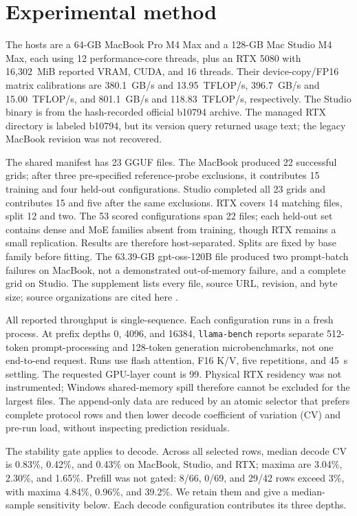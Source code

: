 \documentclass{article}
\begin{document}
\section{Experimental method}
\label{sec:method}

The hosts are a 64-GB MacBook Pro M4 Max and a 128-GB Mac Studio M4 Max, each
using 12 performance-core threads, plus an RTX 5080 with 16,302~MiB reported
VRAM, CUDA, and 16 threads.  Their device-copy/FP16 matrix calibrations are
380.1~GB/s and 13.95~TFLOP/s, 396.7~GB/s and 15.00~TFLOP/s, and 801.1~GB/s and
118.83~TFLOP/s, respectively.  The Studio binary is from the hash-recorded
official b10794 archive.  The managed RTX directory is labeled b10794, but its
version query returned usage text; the legacy MacBook revision was not recovered.

The shared manifest has 23 GGUF files.  The MacBook produced 22 successful
grids; after three pre-specified reference-probe exclusions, it contributes 15
training and four held-out configurations.  Studio completed all 23 grids and
contributes 15 and five after the same exclusions.  RTX covers 14 matching files,
split 12 and two.  The 53 scored configurations span 22 files; each held-out set
contains dense and MoE families absent from training, though RTX remains a small
replication.  Results are therefore host-separated.  Splits are fixed by base
family before fitting.  The 63.39-GB gpt-oss-120B file produced two prompt-batch
failures on MacBook, not a demonstrated out-of-memory failure, and a complete
grid on Studio.  The supplement lists every file, source URL, revision, and byte
size; source organizations are cited here \cite{unsloth_models,lmstudio_models,
ggmlorg_models,google_models,bartowski_models}.

All reported throughput is single-sequence.  Each configuration runs in a
fresh process.  At prefix depths 0, 4096, and 16384, \texttt{llama-bench}
reports separate 512-token prompt-processing and 128-token generation
microbenchmarks, not one end-to-end request.  Runs use flash attention, F16 K/V,
five repetitions, and 45~s settling.  The requested GPU-layer count is 99.  Physical
RTX residency was not instrumented; Windows shared-memory spill therefore
cannot be excluded for the largest files.  The append-only data are reduced by
an atomic selector that prefers complete protocol rows and then lower decode
coefficient of variation (CV)
and pre-run load, without inspecting prediction residuals.

The stability gate applies to decode.  Across all selected rows, median decode
CV is 0.83\%, 0.42\%, and 0.43\% on MacBook, Studio, and RTX; maxima are 3.04\%,
2.30\%, and 1.65\%.  Prefill was not gated: 8/66, 0/69, and 29/42 rows exceed 3\%,
with maxima 4.84\%, 0.96\%, and 39.2\%.  We retain them and give a median-sample
sensitivity below.  Each decode configuration contributes its three depths.
\end{document}
